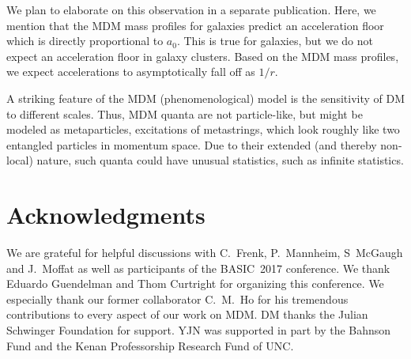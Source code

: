 \documentclass{bjp}
\begin{document}
We plan to elaborate on this observation in  a separate publication. Here, we mention that the MDM mass profiles for galaxies predict an acceleration floor which is directly proportional to $a_0$. This is true for galaxies, but we do not expect an acceleration floor in galaxy clusters. Based on the MDM mass profiles, we expect accelerations to asymptotically fall off as $1/r$.

A striking feature of the MDM (phenomenological) model is the sensitivity of DM to different scales. Thus, MDM quanta are not particle-like, but might be modeled as metaparticles, excitations of metastrings, which look roughly like two entangled particles in momentum space.\cite{Freidel:2017nhg, Freidel:2017wst} Due to their extended (and thereby non-local) nature, such quanta could have unusual statistics, such as infinite statistics.\cite{Greenberg:1989ty, Ho:2012ar}


\section*{Acknowledgments}

We are grateful for helpful discussions with C.~Frenk, P.~Mannheim, S~McGaugh and J.~Moffat as well as participants of the BASIC~2017 conference. We thank Eduardo Guendelman and Thom Curtright for organizing this conference. We especially thank our former collaborator C.~M.~Ho for his tremendous contributions to every aspect of our work on MDM. DM thanks the Julian Schwinger Foundation for support. YJN was supported in part by the Bahnson Fund and the Kenan Professorship Research Fund of UNC.



{}
\end{document}
